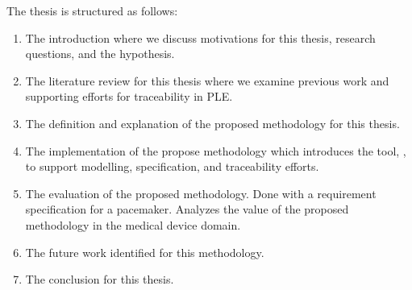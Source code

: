 The thesis is structured as follows:
\begin{enumerate}[label=\textbf{Chapter \arabic*:}]
	\item The introduction where we discuss motivations for this thesis, research questions, and the hypothesis.
	\item The literature review for this thesis where we examine previous work and supporting efforts for traceability in \ac{PLE}.
	\item The definition and explanation of the proposed methodology for this thesis.
	\item The implementation of the propose methodology which introduces the tool, \tool, to support modelling, specification, and traceability efforts.
	\item The evaluation of the proposed methodology. Done with a requirement specification for a pacemaker. Analyzes the value of the proposed methodology in the medical device domain.
	\item The future work identified for this methodology.
	\item The conclusion for this thesis.
\end{enumerate}







